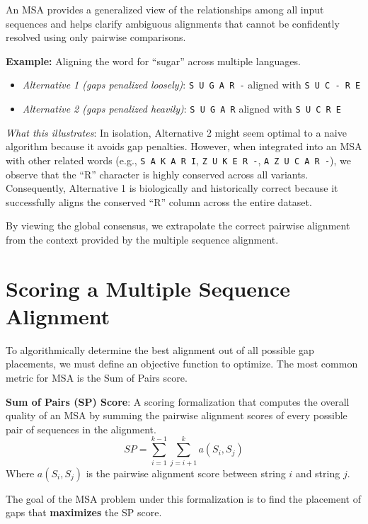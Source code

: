 An MSA provides a generalized view of the relationships among all input sequences and helps clarify ambiguous alignments that cannot be confidently resolved using only pairwise comparisons.

\textbf{Example:} Aligning the word for ``sugar'' across multiple languages.
\begin{itemize}
    \item \textit{Alternative 1 (gaps penalized loosely)}: \texttt{S U G A R -} aligned with \texttt{S U C - R E}
    \item \textit{Alternative 2 (gaps penalized heavily)}: \texttt{S U G A R} aligned with \texttt{S U C R E}
\end{itemize}
\textit{What this illustrates}: In isolation, Alternative 2 might seem optimal to a naive algorithm because it avoids gap penalties. However, when integrated into an MSA with other related words (e.g., \texttt{S A K A R I}, \texttt{Z U K E R -}, \texttt{A Z U C A R -}), we observe that the ``R'' character is highly conserved across all variants. Consequently, Alternative 1 is biologically and historically correct because it successfully aligns the conserved ``R'' column across the entire dataset.

By viewing the global consensus, we extrapolate the correct pairwise alignment from the context provided by the multiple sequence alignment.

\section{Scoring a Multiple Sequence Alignment}

To algorithmically determine the best alignment out of all possible gap placements, we must define an objective function to optimize. The most common metric for MSA is the Sum of Pairs score.

\begin{important}
    \textbf{Sum of Pairs (SP) Score}: A scoring formalization that computes the overall quality of an MSA by summing the pairwise alignment scores of every possible pair of sequences in the alignment.
    \[
    SP = \sum_{i=1}^{k-1} \sum_{j=i+1}^k a(S_i, S_j)
    \]
    Where $a(S_i, S_j)$ is the pairwise alignment score between string $i$ and string $j$.
\end{important}

The goal of the MSA problem under this formalization is to find the placement of gaps that \textbf{maximizes} the SP score.

